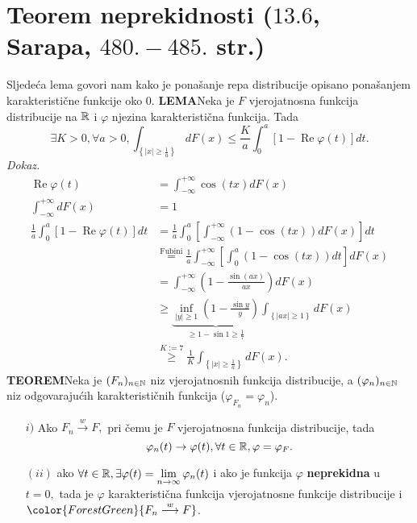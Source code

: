\documentclass{article}
\newcommand{\myre}{\operatorname{Re}}
\begin{document}
\section{Teorem neprekidnosti (\textsection \(13.6\), Sarapa, \(480.-485.\) str.)}
Sljedeća lema govori nam kako je ponašanje repa distribucije opisano ponašanjem karakteristične funkcije oko \(0.\)\newline
\textbf{LEMA}\newline Neka je \(F\) vjerojatnosna funkcija distribucije na \(\Bbb R\) i \(\varphi\) njezina karakteristična funkcija. Tada \[\exists K>0,\forall a>0,\int_{\left\{|x|\ge\frac1a\right\}}dF(x)\le\frac{K}a\int_0^a\left[1-\myre\varphi(t)\right]dt.\] 
\textit{Dokaz.} \[\begin{aligned}\myre\varphi(t)&=\int_{-\infty}^{+\infty}\cos(tx)dF(x)\\\int_{-\infty}^{+\infty}dF(x)&=1\\\frac1a\int_0^a\left[1-\myre\varphi(t)\right]dt&=\frac1a\int_0^a\left[\int_{-\infty}^{+\infty}\left(1-\cos(tx)\right)dF(x)\right]dt\\&\overset{\text{Fubini}}{=}\frac1a\int_{-\infty}^{+\infty}\left[\int_0^a\left(1-\cos(tx)\right)dt\right]dF(x)\\&=\int_{-\infty}^{+\infty}\left(1-\frac{\sin(ax)}{ax}\right)dF(x)\\&\ge\underbrace{\inf_{|y|\ge 1}\left(1-\frac{\sin y}y\right)}_{\ge 1-\sin 1\ge\frac17}\int_{\left\{|ax|\ge 1\right\}}dF(x)\\&\overset{K:=7}{\ge}\frac1K\int_{\left\{|x|\ge\frac1a\right\}}dF(x).\end{aligned}\] 
\textbf{TEOREM}\newline Neka je \((F_n)_{n\in\Bbb N}\) niz vjerojatnosnih funkcija distribucije, a \((\varphi_n)_{n\in\Bbb N}\) niz odgovarajućih karakterističnih funkcija (\(\varphi_{F_n}=\varphi_n\)).
\begin{enumerate}
    \item[\(i)\)] Ako \(F_n\overset{w}{\longrightarrow}F,\) pri čemu je \(F\) vjerojatnosna funkcija distribucije, tada \[\varphi_n(t)\to\varphi(t),\forall t\in\Bbb R,\varphi=\varphi_F.\]
    \item[\((ii)\)] ako \(\displaystyle\forall t\in\Bbb R,\exists\varphi(t)=\lim_{n\to\infty}\varphi_n(t)\) i ako je funkcija \(\varphi\) \textbf{neprekidna} u \(\boxed{t=0},\) tada je \(\varphi\) karakteristična funkcija vjerojatnosne funkcije distribucije i \(\color{ForestGreen}{F_n\overset{w}{\longrightarrow}F}\).
\end{enumerate}
\end{document}
